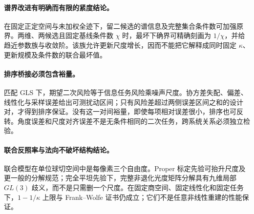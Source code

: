 \paragraph{谱界改进有明确而有限的紧度结论。}
在固定正定空间与未加权全迹下，留二候选的谱信息及完整集合条件数可加强原界。两维、两候选且固定基线条件数 $\chi$ 时，最坏下确界可精确刻画为 $1/\chi$，并给趋近参数族与收敛阶。该族允许更新尺度增长，因而不能把它解释成同时固定 $\kappa$、更新规模及条件数的联合最坏值。

\paragraph{排序桥接必须包含裕量。}
匹配 GLS 下，期望二次风险等于信息任务风险乘噪声尺度。协方差失配、偏差、线性化与采样误差给出可测扰动区间；只有风险差超过两侧误差区间之和的设计对，才得到排序保证。没有这一对间裕量，即使每项相对误差很小，排序也可反转。角度误差和尺度对齐误差不是无条件相同的二次任务，跨系统关系必须独立检验。

\paragraph{联合反照率与法向不破坏结构结论。}
联合模型在单位球切空间中是每像素三个自由度。Proper 标定先验可抬升尺度及更一般的分解规范；完全平坦先验下，完整非退化光度矩阵分解具有九维局部 $GL(3)$ 歧义，而不是只需删一个尺度。在固定商空间、固定线性化和固定任务下，$1-1/\kappa$ 上限与 Frank--Wolfe 证书仍成立；它们不是任意非线性重建的性能保证。
